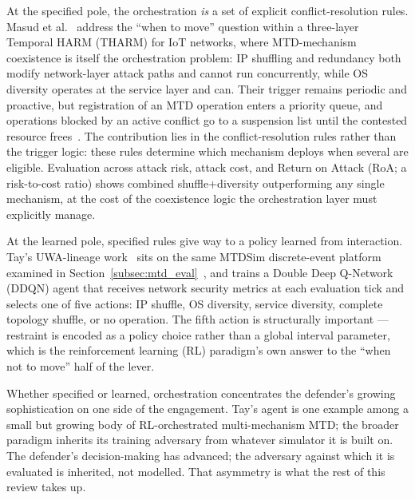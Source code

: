 At the specified pole, the orchestration \emph{is} a set of explicit
conflict-resolution rules. Masud et al.~\cite{masud2025} address
the ``when to move'' question within a three-layer Temporal HARM (THARM) for IoT networks, where
MTD-mechanism coexistence is itself the orchestration problem: IP
shuffling and redundancy both modify network-layer attack paths and
cannot run concurrently, while OS diversity operates at the service
layer and can. Their trigger remains periodic and proactive, but
registration of an MTD operation enters a priority queue, and operations
blocked by an active conflict go to a suspension list until the
contested resource frees~\cite{masud2025}. The contribution lies in the conflict-resolution rules rather than the
trigger logic: these rules determine which mechanism deploys when
several are eligible. Evaluation across
attack risk, attack cost, and Return on Attack (RoA; a risk-to-cost ratio) shows combined
shuffle+diversity outperforming any single mechanism, at the cost of the
coexistence logic the orchestration layer must explicitly manage.

At the learned pole, specified rules give way to a policy learned from
interaction. Tay's UWA-lineage work~\cite{tay2024} sits
on the same MTDSim discrete-event platform examined in
Section~\ref{subsec:mtd_eval}~\cite{brown2023}, and trains a Double Deep
Q-Network (DDQN) agent that receives network security metrics at each
evaluation tick and selects one of five actions: IP shuffle, OS
diversity, service diversity, complete topology shuffle, or no
operation. The fifth action is structurally important --- restraint is
encoded as a policy choice rather than a global interval parameter,
which is the reinforcement learning (RL) paradigm's own answer to the ``when not to move'' half
of the lever.

Whether specified or learned, orchestration concentrates the defender's
growing sophistication on one side of the engagement. Tay's agent is one
example among a small but growing body of RL-orchestrated
multi-mechanism MTD; the broader paradigm inherits its training
adversary from whatever simulator it is built on. The defender's
decision-making has advanced; the adversary against which it is
evaluated is inherited, not modelled. That asymmetry is what the rest of
this review takes up.